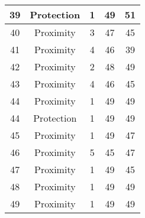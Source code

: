 \documentclass[results.tex]{subfiles}
\begin{document}
\begin{center}
\begin{tabular}{| c || c | c | c | c |}
            \hline
            39                      & Protection                   & 1                      & 49                      & 51                   \\
            \hline
            40                      & Proximity                    & 3                      & 47                      & 45                   \\
            \hline
            41                      & Proximity                    & 4                      & 46                      & 39                   \\
            \hline
            42                      & Proximity                    & 2                      & 48                      & 49                   \\
            \hline
            43                      & Proximity                    & 4                      & 46                      & 45                   \\
            \hline
            44                      & Proximity                    & 1                      & 49                      & 49                   \\
            \hline
            44                      & Protection                   & 1                      & 49                      & 49                   \\
            \hline
            45                      & Proximity                    & 1                      & 49                      & 47                   \\
            \hline
            46                      & Proximity                    & 5                      & 45                      & 47                   \\
            \hline
            47                      & Proximity                    & 1                      & 49                      & 45                   \\
            \hline
            48                      & Proximity                    & 1                      & 49                      & 49                   \\
            \hline
            49                      & Proximity                    & 1                      & 49                      & 49                   \\
            \hline
        \end{tabular}
    \end{center}
\end{document}
